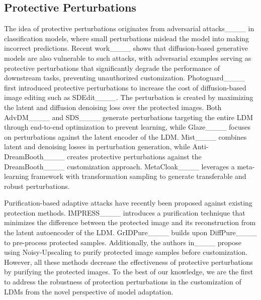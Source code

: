 \subsection{Protective Perturbations}
The idea of protective perturbations originates from adversarial attacks____ in classification models, where small perturbations mislead the model into making incorrect predictions. 
Recent work____ shows that diffusion-based generative models are also vulnerable to such attacks, with adversarial examples serving as protective perturbations that significantly degrade the performance of downstream tasks, preventing unauthorized customization.
Photoguard____ first introduced protective perturbations to increase the cost of diffusion-based image editing such as SDEdit____.
The perturbation is created by maximizing the latent and diffusion denoising loss over the protected images.
Both AdvDM____ and SDS____ generate perturbations targeting the entire LDM through end-to-end optimization to prevent learning, while Glaze____ focuses on perturbations against the latent encoder of the LDM. Mist____ combines latent and denoising losses in perturbation generation, while Anti-DreamBooth____ creates protective perturbations against the DreamBooth____ customization approach.
MetaCloak____ leverages a meta-learning framework with transformation sampling to generate transferable and robust perturbations.

Purification-based adaptive attacks have recently been proposed against existing protection methods. 
IMPRESS____ introduces a purification technique that minimizes the difference between the protected image and its reconstruction from the latent autoencoder of the LDM. 
GrIDPure____ builds upon DiffPure____ to pre-process protected samples. 
Additionally, the authors in____ propose using Noisy-Upscaling to purify protected image samples before customization.
However, all these methods decrease the effectiveness of protective perturbations by purifying the protected images. 
To the best of our knowledge, we are the first to address the robustness of protection perturbations in the customization of LDMs from the novel perspective of model adaptation.